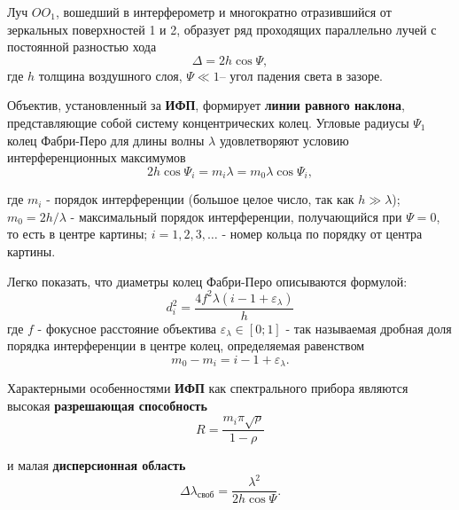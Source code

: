 Луч $OO_1$, вошедший в интерферометр и многократно отразившийся от зеркальных поверхностей 1 и 2, образует ряд проходящих параллельно лучей с постоянной разностью хода 
\begin{equation}
	\Delta=2h \cos \Psi,
\end{equation} где $h$ толщина воздушного слоя, $\Psi\ll 1$-- угол падения света в зазоре. 

Объектив, установленный за \textbf{ИФП}, формирует \textbf{линии равного наклона}, представляющие собой систему концентрических колец. Угловые радиусы $\Psi_1$ колец Фабри-Перо для длины волны $\lambda$ удовлетворяют условию интерференционных максимумов 
\begin{equation}
\label{eq:24}
	2h \cos \Psi_i = m_i \lambda=m_0 \lambda \cos \Psi_i,
\end{equation}

где $m_i$ - порядок интерференции (большое целое число, так как $h \gg \lambda$); $m_0=2h/\lambda$ - максимальный порядок интерференции, получающийся при $\Psi=0$, то есть в центре картины; $i=1, 2, 3,\dots$ - номер кольца по порядку от центра картины. 



Легко показать, что диаметры колец Фабри-Перо описываются формулой: 
\begin{equation}
	\label{eqL25}
	d_i^2=\frac{4 f^2 \lambda (i-1+\varepsilon_{\lambda})}{h}
\end{equation}
где $f$ - фокусное расстояние объектива $\varepsilon_{\lambda} \in [0;1]$ - так называемая дробная доля порядка интерференции в центре колец, определяемая равенством 
\begin{equation}
	\label{eq:26}
	m_0 - m_i=i-1+\varepsilon_{\lambda}.
\end{equation}

 Характерными особенностями \textbf{ИФП} как спектрального прибора являются высокая \textbf{разрешающая способность}
 \begin{equation}
 	\label{eq:27}
 	R=\frac{m_i \pi \sqrt{\rho}}{1-\rho}
 \end{equation}
 
и малая \textbf{дисперсионная область}
\begin{equation}
	\label{eq:28}
 	\Delta \lambda_{\text{своб}}=\frac{\lambda^2}{2h \cos \Psi}.
 \end{equation} 

